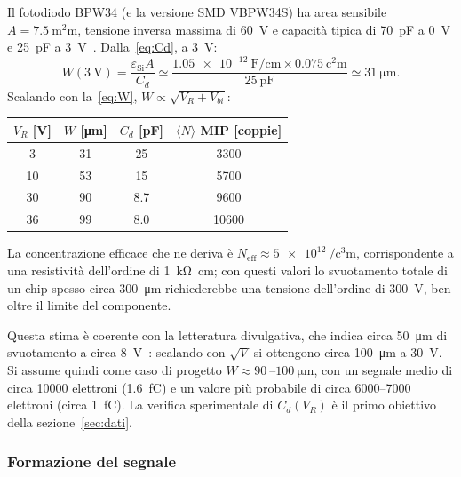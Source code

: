 \documentclass[11pt,a4paper]{article}
\begin{document}
Il fotodiodo BPW34 (e la versione SMD VBPW34S) ha area sensibile $A = \SI{7.5}{\square\milli\metre}$, tensione inversa massima di \SI{60}{\volt} e capacità tipica di \SI{70}{\pico\farad} a \SI{0}{\volt} e \SI{25}{\pico\farad} a \SI{3}{\volt}~\cite{bpw34}. Dalla~\eqref{eq:Cd}, a \SI{3}{\volt}:
\begin{equation}
  W(\SI{3}{\volt}) = \frac{\varepsilon_{\mathrm{Si}}A}{C_d} \simeq \frac{\SI{1.05e-12}{\farad\per\centi\metre}\times\SI{0.075}{\square\centi\metre}}{\SI{25}{\pico\farad}} \simeq \SI{31}{\micro\metre}.
\end{equation}
Scalando con la~\eqref{eq:W}, $W\propto\sqrt{V_R+V_{bi}}$:
\begin{center}
\begin{tabular}{cccc}
\toprule
$V_R$ [\si{\volt}] & $W$ [\si{\micro\metre}] & $C_d$ [\si{\pico\farad}] & $\langle N\rangle$ MIP [coppie] \\
\midrule
3  & 31 & 25  & \num{3300} \\
10 & 53 & 15  & \num{5700} \\
30 & 90 & 8.7 & \num{9600} \\
36 & 99 & 8.0 & \num{10600} \\
\bottomrule
\end{tabular}
\end{center}
La concentrazione efficace che ne deriva è $N_{\mathrm{eff}} \approx \SI{5e12}{\per\cubic\centi\metre}$, corrispondente a una resistività dell'ordine di \SI{1}{\kilo\ohm\centi\metre}; con questi valori lo svuotamento totale di un chip spesso circa \SI{300}{\micro\metre} richiederebbe una tensione dell'ordine di \SI{300}{\volt}, ben oltre il limite del componente.

Questa stima è coerente con la letteratura divulgativa, che indica circa \SI{50}{\micro\metre} di svuotamento a circa \SI{8}{\volt}~\cite{physicsopenlab2020}: scalando con $\sqrt{V}$ si ottengono circa \SI{100}{\micro\metre} a \SI{30}{\volt}. Si assume quindi come caso di progetto $W \approx \SI{90}{}$--$\SI{100}{\micro\metre}$, con un segnale medio di circa \num{10000} elettroni (\SI{1.6}{\femto\coulomb}) e un valore più probabile di circa \num{6000}--\num{7000} elettroni (circa \SI{1}{\femto\coulomb}). La verifica sperimentale di $C_d(V_R)$ è il primo obiettivo della sezione~\ref{sec:dati}.

\subsubsection{Formazione del segnale}
\end{document}
